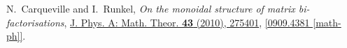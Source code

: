 \documentclass[12pt]{scrartcl}
\newcommand\arxiv[2]      {\href{http://arXiv.org/abs/#1}{#2}}
\newcommand\doi[2]        {\href{http://dx.doi.org/#1}{#2}}
\theoremstyle{definition}
\numberwithin{equation}{section}
\numberwithin{definition}{section}
\numberwithin{figure}{section}
\begin{document}
\begin{thebibliography}{BHLS}

N.~Carqueville and I.~Runkel,
{\it On the monoidal structure of matrix bi-factorisations}, \doi{10.1088/1751-8113/43/27/275401}{J. Phys. A: Math. Theor. \textbf{43} (2010), 275401},
\arxiv{0909.4381}{[0909.4381 [math-ph]]}.


\end{thebibliography}
\end{document}
